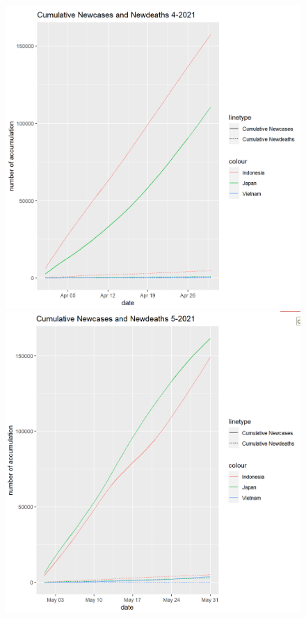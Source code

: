 \documentclass[a4paper]{article}
\theoremstyle{definition}
\begin{document}
\begin{enumerate}[1)]
\begin{figure}[H]
\begin{center}
        \includegraphics[scale=0.4]{vi/cml_new_4_2021.png}
        \includegraphics[scale=0.4]{vi/cml_new_5_2021.png}

\end{center}
\end{figure}
\end{enumerate}
\end{document}
